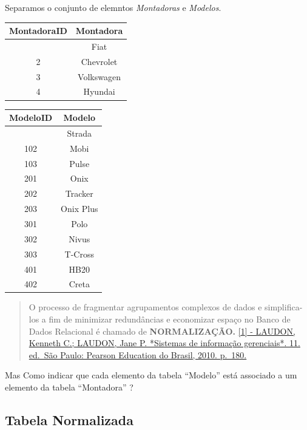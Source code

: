 \documentclass[
]{book}
\begin{document}
Separamos o conjunto de elemntos \emph{Montadoras} e \emph{Modelos}.

\begin{longtable}[]{@{}cc@{}}
\toprule\noalign{}
MontadoraID & Montadora \\
\midrule\noalign{}
\endhead
\bottomrule\noalign{}
\endlastfoot
1 & Fiat \\
2 & Chevrolet \\
3 & Volkswagen \\
4 & Hyundai \\
\end{longtable}

\begin{longtable}[]{@{}cc@{}}
\toprule\noalign{}
ModeloID & Modelo \\
\midrule\noalign{}
\endhead
\bottomrule\noalign{}
\endlastfoot
101 & Strada \\
102 & Mobi \\
103 & Pulse \\
201 & Onix \\
202 & Tracker \\
203 & Onix Plus \\
301 & Polo \\
302 & Nivus \\
303 & T-Cross \\
401 & HB20 \\
402 & Creta \\
\end{longtable}

\begin{quote}
O processo de fragmentar agrupamentos complexos de dados e simplifica-los a fim de minimizar redundâncias e economizar espaço no Banco de Dados Relacional é chamado de \textbf{NORMALIZAÇÃO.} \hyperref[laudon-kenneth-c.-laudon-jane-p.-sistemas-de-informauxe7uxe3o-gerenciais.-11.-ed.-suxe3o-paulo-pearson-education-do-brasil-2010.-p.-180.]{{[}1{]} - LAUDON, Kenneth C.; LAUDON, Jane P. *Sistemas de informação gerenciais*. 11. ed.~São Paulo: Pearson Education do Brasil, 2010. p.~180.}
\end{quote}

Mas Como indicar que cada elemento da tabela ``Modelo'' está associado a um elemento da tabela ``Montadora'' ?

\subsection{Tabela Normalizada}\label{tabela-normalizada}
\end{document}
